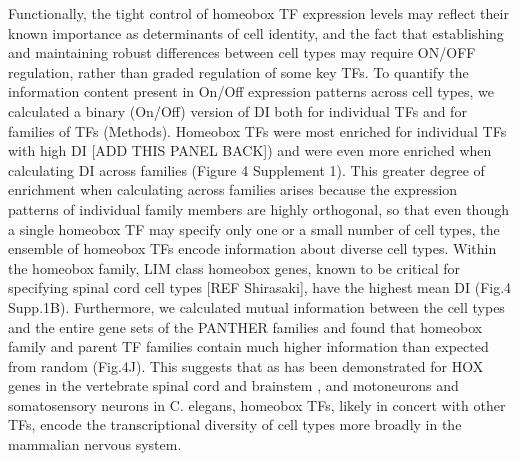 Functionally, the tight control of homeobox TF expression levels may reflect their known importance as determinants of cell identity, and the fact that establishing and maintaining robust differences between cell types may require ON/OFF regulation, rather than graded regulation of some key TFs. To quantify the information content present in On/Off expression patterns across cell types, we calculated a binary (On/Off) version of DI both for individual TFs and for families of TFs (Methods). Homeobox TFs were most enriched for individual TFs with high DI [ADD THIS PANEL BACK]) and were even more enriched when calculating DI across families (Figure 4 Supplement 1). This greater degree of enrichment when calculating across families arises because the expression patterns of individual family members are highly orthogonal, so that even though a single homeobox TF may specify only one or a small number of cell types, the ensemble of homeobox TFs encode information about diverse cell types. Within the homeobox family, LIM class homeobox genes, known to be critical for specifying spinal cord cell types [REF Shirasaki], have the highest mean DI (Fig.4 Supp.1B). Furthermore, we calculated mutual information between the cell types and the entire gene sets of the PANTHER families and found that homeobox family and parent TF families contain much higher information than expected from random (Fig.4J). This suggests that as has been demonstrated for HOX genes in the vertebrate spinal cord and brainstem \cite{Dasen_2009,Philippidou_2013}, and motoneurons \cite{Kratsios_2017} and somatosensory neurons \cite{Zheng_2015} in C. elegans, homeobox TFs, likely in concert with other TFs, encode the transcriptional diversity of cell types more broadly in the mammalian nervous system.
